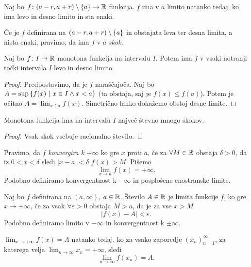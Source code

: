 \documentclass[12pt, a4paper]{article}
\begin{document}
\begin{trditev}
Naj bo $f\colon(a-r,a+r)\setminus\left\{a\right\}\to\mathbb{R}$ funkcija. $f$ ima v $a$ limito natanko tedaj, ko ima levo in desno limito in sta enaki.
\end{trditev}

\obvs

\begin{opomba}
Če je $f$ definirana na $(a-r,a+r)\setminus\left\{a\right\}$ in obstajata leva ter desna limita, a nista enaki, pravimo, da ima $f$ v $a$ \emph{skok}.
\end{opomba}

\begin{izrek}
Naj bo $f\colon I\to\mathbb{R}$ monotona funkcija na intervalu $I$. Potem ima $f$ v vsaki notranji točki intervala $I$ levo in desno limito.
\end{izrek}

\begin{proof}
Predpostavimo, da je $f$ naraščajoča. Naj bo $A=\sup\left\{f(x)~\middle\vert~x\in I\land x<a\right\}$ (ta obstaja, saj je $f(x)\leq f(a)$). Potem je očitno $A=\displaystyle\lim_{x\uparrow a}f(x)$. Simetrično lahko dokažemo obstoj desne limite.
\end{proof}

\begin{posledica}
Monotona funkcija ima na intervalu $I$ največ števno mnogo skokov.
\end{posledica}

\begin{proof}
Vsak skok vsebuje racionalno število.
\end{proof}

\begin{definicija}
Pravimo, da $f$ \emph{konvergira k $+\infty$} ko gre $x$ proti $a$, če za $\forall M\in\mathbb{R}$ obstaja $\delta>0$, da iz $0<x<\delta$ sledi $|x-a|<\delta$ $f(x)>M$. Pišemo
\[
\lim_{x\to a}f(x)=+\infty.
\]
Podobno definiramo konvergentnost k $-\infty$ in posplošene enostranske limite.
\end{definicija}

\begin{definicija}
Naj bo $f$ definirana na $(a,\infty)$, $a\in\mathbb{R}$. Število $A\in\mathbb{R}$ je limita funkcije $f$, ko gre $x\to+\infty$, če za vsak $\forall\varepsilon>0$ obstaja $M>a$, da je za vse $x>M$
\[
|f(x)-A|<\varepsilon.
\]
Podobno definiramo limito v $-\infty$ in konvergentnost k $\pm\infty$.
\end{definicija}

\begin{opomba}
$\displaystyle\lim_{x\to+\infty}f(x)=A$ natanko tedaj, ko za vsako zaporedje $(x_n)_{n=1}^\infty$, za katerega velja $\displaystyle\lim_{n\to\infty}x_n=+\infty$, sledi
\[
\lim_{n\to\infty}f(x_n)=A.
\]
\end{opomba}
\end{document}
